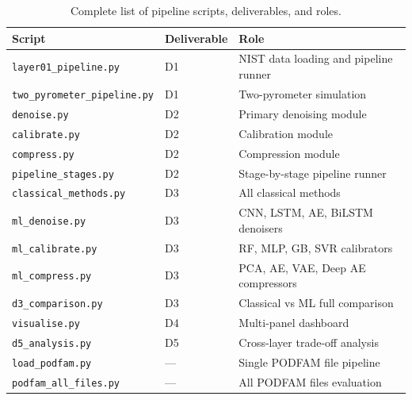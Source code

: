 \begin{table}[H]
\centering
\caption{Complete list of pipeline scripts, deliverables, and roles.}
\label{tab:scripts}
\begin{tabular}{lll}
\toprule
\textbf{Script} & \textbf{Deliverable} & \textbf{Role} \\
\midrule
\texttt{layer01\_pipeline.py}        & D1 & NIST data loading and pipeline runner \\
\texttt{two\_pyrometer\_pipeline.py} & D1 & Two-pyrometer simulation \\
\texttt{denoise.py}                  & D2 & Primary denoising module \\
\texttt{calibrate.py}                & D2 & Calibration module \\
\texttt{compress.py}                 & D2 & Compression module \\
\texttt{pipeline\_stages.py}         & D2 & Stage-by-stage pipeline runner \\
\texttt{classical\_methods.py}       & D3 & All classical methods \\
\texttt{ml\_denoise.py}              & D3 & CNN, LSTM, AE, BiLSTM denoisers \\
\texttt{ml\_calibrate.py}            & D3 & RF, MLP, GB, SVR calibrators \\
\texttt{ml\_compress.py}             & D3 & PCA, AE, VAE, Deep AE compressors \\
\texttt{d3\_comparison.py}           & D3 & Classical vs ML full comparison \\
\texttt{visualise.py}                & D4 & Multi-panel dashboard \\
\texttt{d5\_analysis.py}             & D5 & Cross-layer trade-off analysis \\
\texttt{load\_podfam.py}             & --- & Single PODFAM file pipeline \\
\texttt{podfam\_all\_files.py}       & --- & All PODFAM files evaluation \\
\bottomrule
\end{tabular}
\end{table}

\let\cleardoublepage\clearpage
